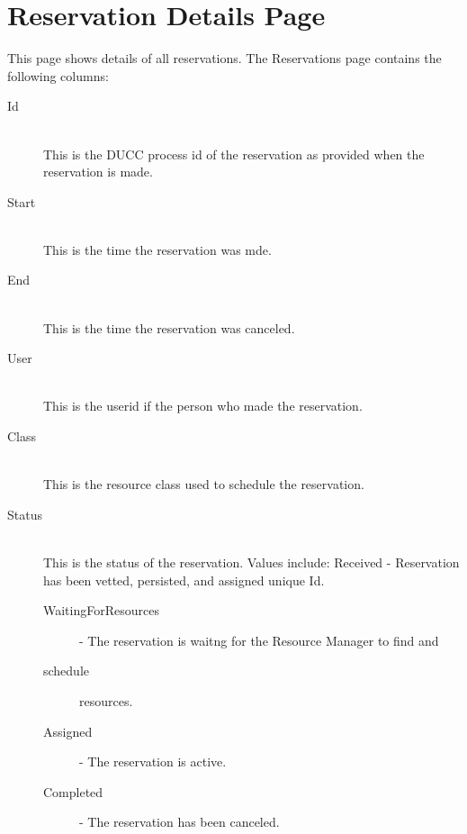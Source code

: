
    \section{Reservation Details Page}

        This page shows details of all reservations. The Reservations page contains the following columns: 
        \begin{description}

            \item[Id] \hfill \\
              This is the DUCC process id of the reservation as provided when the reservation is
              made.

            \item[Start] \hfill \\
              This is the time the reservation was mde.
              
            \item[End] \hfill \\
              This is the time the reservation was canceled.
              
            \item[User] \hfill \\
              This is the userid if the person who made the reservation.
              
            \item[Class] \hfill \\
              This is the resource class used to schedule the reservation.
              
            \item[Status] \hfill \\
              This is the status of the reservation. Values include: Received - Reservation
              has been vetted, persisted, and assigned unique Id.
              \begin{description}
                  \item[WaitingForResources] - The reservation is waitng for the Resource Manager to find and 
                  \item[schedule] resources. 
                  \item[Assigned] - The reservation is active. 
                  \item[Completed] - The reservation has been canceled.                     
              \end{description}


\end{description}
